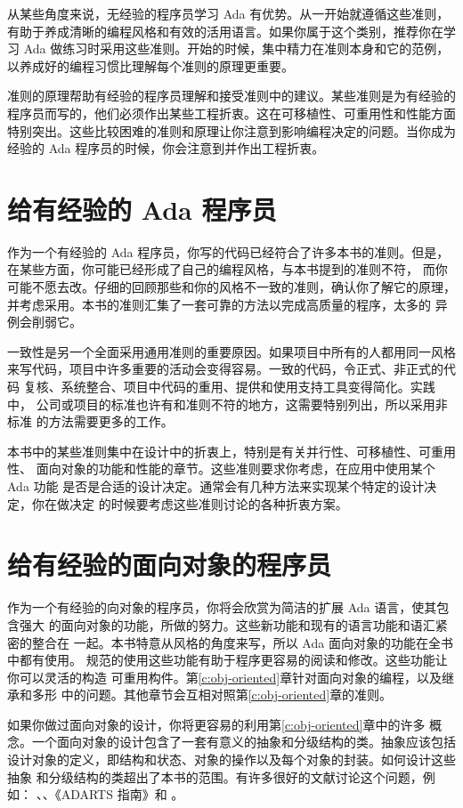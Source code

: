 从某些角度来说，无经验的程序员学习 Ada 有优势。从一开始就遵循这些准则，
有助于养成清晰的编程风格和有效的活用语言。如果你属于这个类别，推荐你在学习
Ada 做练习时采用这些准则。开始的时候，集中精力在准则本身和它的范例，
以养成好的编程习惯比理解每个准则的原理更重要。

准则的原理帮助有经验的程序员理解和接受准则中的建议。某些准则是为有经验的
程序员而写的，他们必须作出某些工程折衷。这在可移植性、可重用性和性能方面
特别突出。这些比较困难的准则和原理让你注意到影响编程决定的问题。当你成为
经验的 Ada 程序员的时候，你会注意到并作出工程折衷。

\section{给有经验的 Ada 程序员}
作为一个有经验的 Ada 程序员，你写的代码已经符合了许多本书的准则。但是，
在某些方面，你可能已经形成了自己的编程风格，与本书提到的准则不符，
而你可能不愿去改。仔细的回顾那些和你的风格不一致的准则，确认你了解它的原理，
并考虑采用。本书的准则汇集了一套可靠的方法以完成高质量的程序，太多的
异例会削弱它。

一致性是另一个全面采用通用准则的重要原因。如果项目中所有的人都用同一风格
来写代码，项目中许多重要的活动会变得容易。一致的代码，令正式、非正式的代码
复核、系统整合、项目中代码的重用、提供和使用支持工具变得简化。实践中，
公司或项目的标准也许有和准则不符的地方，这需要特别列出，所以采用非标准
的方法需要更多的工作。

本书中的某些准则集中在设计中的折衷上，特别是有关并行性、可移植性、可重用性、
面向对象的功能和性能的章节。这些准则要求你考虑，在应用中使用某个 Ada 功能
是否是合适的设计决定。通常会有几种方法来实现某个特定的设计决定，你在做决定
的时候要考虑这些准则讨论的各种折衷方案。

\section{给有经验的面向对象的程序员}
作为一个有经验的向对象的程序员，你将会欣赏为简洁的扩展 Ada 语言，使其包含强大
的面向对象的功能，所做的努力。这些新功能和现有的语言功能和语汇紧密的整合在
一起。本书特意从风格的角度来写，所以 Ada 面向对象的功能在全书中都有使用。
规范的使用这些功能有助于程序更容易的阅读和修改。这些功能让你可以灵活的构造
可重用构件。第\ref{c:obj-oriented}章针对面向对象的编程，以及继承和多形
中的问题。其他章节会互相对照第\ref{c:obj-oriented}章的准则。

如果你做过面向对象的设计，你将更容易的利用第\ref{c:obj-oriented}章中的许多
概念。一个面向对象的设计包含了一套有意义的抽象和分级结构的类。抽象应该包括
设计对象的定义，即结构和状态、对象的操作以及每个对象的封装。如何设计这些抽象
和分级结构的类超出了本书的范围。有许多很好的文献讨论这个问题，例如：
\cite{rumbaugh91}、\cite{jacobson92}、《ADARTS 指南》\cite{spc93}和
\cite{booch94}。


